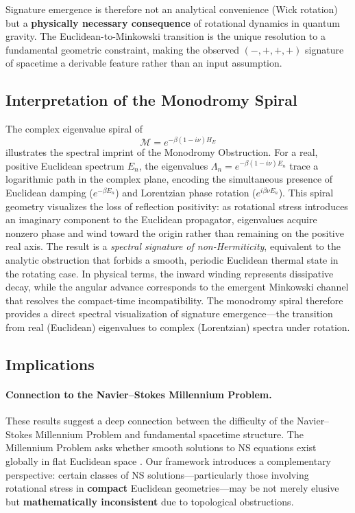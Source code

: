 \documentclass[11pt]{article}
\begin{document}
Signature emergence is therefore not an analytical convenience (Wick rotation) but 
a \textbf{physically necessary consequence} of rotational dynamics in quantum gravity. 
The Euclidean-to-Minkowski transition is the unique resolution to a fundamental 
geometric constraint, making the observed $(-,+,+,+)$ signature of spacetime a 
derivable feature rather than an input assumption.

\subsection*{Interpretation of the Monodromy Spiral}

The complex eigenvalue spiral of
\[
\mathcal{M} = e^{-\beta (1 - i\nu) H_E}
\]
illustrates the spectral imprint of the Monodromy Obstruction.
For a real, positive Euclidean spectrum \(E_n\), the eigenvalues
\(\Lambda_n = e^{-\beta(1 - i\nu)E_n}\)
trace a logarithmic path in the complex plane, encoding the simultaneous presence of Euclidean damping (\(e^{-\beta E_n}\)) and Lorentzian phase rotation (\(e^{i\beta\nu E_n}\)).
This spiral geometry visualizes the loss of reflection positivity: as rotational stress introduces an imaginary component to the Euclidean propagator, eigenvalues acquire nonzero phase and wind toward the origin rather than remaining on the positive real axis.
The result is a \emph{spectral signature of non-Hermiticity}, equivalent to the analytic obstruction that forbids a smooth, periodic Euclidean thermal state in the rotating case.
In physical terms, the inward winding represents dissipative decay, while the angular advance corresponds to the emergent Minkowski channel that resolves the compact-time incompatibility.
The monodromy spiral therefore provides a direct spectral visualization of signature emergence—the transition from real (Euclidean) eigenvalues to complex (Lorentzian) spectra under rotation.


\subsection{Implications}

\paragraph{Connection to the Navier--Stokes Millennium Problem.}
These results suggest a deep connection between the difficulty of the Navier--Stokes 
Millennium Problem and fundamental spacetime structure. The Millennium Problem asks 
whether smooth solutions to NS equations exist globally in flat Euclidean space 
\cite{NavierStokesMillennium}. Our framework introduces a complementary perspective: 
certain classes of NS solutions---particularly those involving rotational stress in 
\textbf{compact} Euclidean geometries---may be not merely elusive but 
\textbf{mathematically inconsistent} due to topological obstructions.
\end{document}
